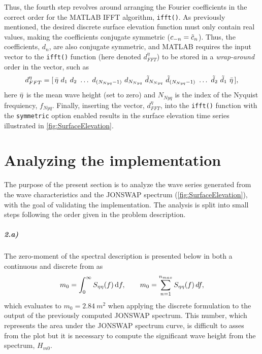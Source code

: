 Thus, the fourth step revolves around arranging the Fourier coefficients in the correct order for the MATLAB IFFT algorithm, \verb+ifft()+. As previously mentioned, the desired discrete surface elevation function must only contain real values, making the coefficients conjugate symmetric ($c_{-n}=\Tilde{c}_n$). Thus, the coefficients, $d_n$, are also conjugate symmetric, and MATLAB requires the input vector to the \verb+ifft()+ function (here denoted $d_{FFT}^\eta$) to be stored in a \textit{wrap-around} order in the vector, such as
\begin{equation}
    d_{FFT}^\eta = [\, \Bar{\eta}\ d_1\ d_2\ \dots \ d_{(N_{Nyq}-1)} \ d_{N_{Nyq}} \ \Tilde{d}_{N_{Nyq}} \ \Tilde{d}_{(N_{Nyq}-1)} \ \dots \  \Tilde{d}_2 \ \Tilde{d}_1 \ \Bar{\eta} \, ], 
    \label{eq:dfftvector}
\end{equation} 
here $\Bar{\eta}$ is the mean wave height (set to zero) and $N_{Nyq}$ is the index of the Nyquist frequiency, $f_{Nyq}$. Finally, inserting the vector, $d_{FFT}^\eta$, into the \verb+ifft()+ function with the \verb+symmetric+ option enabled results in the surface elevation time series illustrated in \cref{fig:SurfaceElevation}. 

\vspace{15mm}
{\let\clearpage\relax \chapter{Analyzing the implementation}}

The purpose of the present section is to analyze the wave series generated from the wave characteristics and the JONSWAP spectrum (\cref{fig:SurfaceElevation}), with the goal of validating the implementation. The analysis is split into small steps following the order given in the problem description.

\paragraph{2.a)} The zero-moment of the spectral description is presented below in both a continuous and discrete from as
\begin{equation}
    m_0 = \int_0^\infty S_{\eta \eta}(f) \dif f, \qquad m_0 = \sum_{n=1}^{n_{max}} S_{\eta\eta}(f)\,df,
\end{equation}
which evaluates to $m_0=\SI{2.84}{m^2}$ when applying the discrete formulation to the output of the previously computed JONSWAP spectrum. This number, which represents the area under the JONSWAP spectrum curve, is difficult to asses from the plot but it is necessary to compute the significant wave height from the spectrum, $H_{m0}$.
\squeezeup
